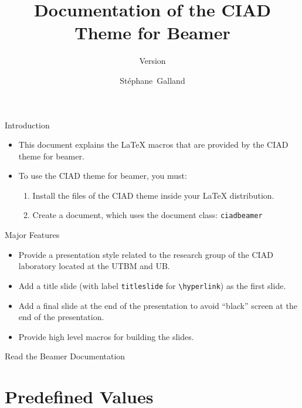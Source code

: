 \documentclass[english,sectioncirclenumberstyle]{ciadbeamer}
\title{Documentation of the CIAD Theme for Beamer}
\subtitle{Version \insertciadbeamerthemeversion}
\author[S.~Galland]{St\'ephane~Galland}
\begin{document}
\begin{frame}{Introduction}
	\begin{itemize}
	\item This document explains the {\LaTeX} macros that are provided by the CIAD theme for beamer.
	\vfill
	\item To use the CIAD theme for beamer, you must:
		\begin{enumerate}
		\item Install the files of the CIAD theme inside your {\LaTeX} distribution.
		\item Create a document, which uses the document class: \texttt{ciadbeamer}
		\end{enumerate}
	\end{itemize}
\end{frame}

\begin{frame}{Major Features}
	\begin{itemize}
	\item Provide a presentation style related to the research group of the CIAD laboratory located at the UTBM and UB.
	\vfill
	\item Add a title slide (with label \texttt{titleslide} for \texttt{{\textbackslash}hyperlink}) as the first slide.
	\vfill
	\item Add a final slide at the end of the presentation to avoid ``black'' screen at the end of the presentation.
	\vfill
	\item Provide high level macros for building the slides.
	\end{itemize}
\end{frame}

\begin{frame}{Read the Beamer Documentation}
	\huge
	\vspace{2em}
\end{frame}

\tableofcontentslide

\section{Predefined Values}
\tableofcontentslide[sectionstyle={show/shaded},subsectionstyle={show/show/hide},subsubsectionstyle={hide/hide/hide/hide}]
\end{document}
